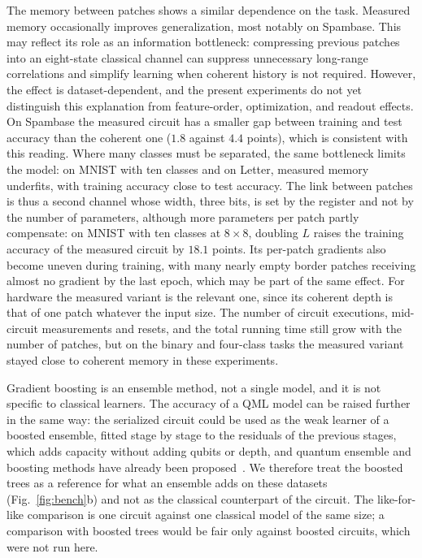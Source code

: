 \documentclass[11pt]{article}
\begin{document}
The memory between patches shows a similar dependence on the task. Measured memory occasionally improves generalization, most notably on Spambase. This may reflect its role as an information bottleneck: compressing previous patches into an eight-state classical channel can suppress unnecessary long-range correlations and simplify learning when coherent history is not required. However, the effect is dataset-dependent, and the present experiments do not yet distinguish this explanation from feature-order, optimization, and readout effects. On Spambase the measured circuit has a smaller gap between training and test accuracy than the coherent one ($1.8$ against $4.4$ points), which is consistent with this reading. Where many classes must be separated, the same bottleneck limits the model: on MNIST with ten classes and on Letter, measured memory underfits, with training accuracy close to test accuracy. The link between patches is thus a second channel whose width, three bits, is set by the register and not by the number of parameters, although more parameters per patch partly compensate: on MNIST with ten classes at $8\times8$, doubling $L$ raises the training accuracy of the measured circuit by $18.1$ points. Its per-patch gradients also become uneven during training, with many nearly empty border patches receiving almost no gradient by the last epoch, which may be part of the same effect. For hardware the measured variant is the relevant one, since its coherent depth is that of one patch whatever the input size. The number of circuit executions, mid-circuit measurements and resets, and the total running time still grow with the number of patches, but on the binary and four-class tasks the measured variant stayed close to coherent memory in these experiments.

Gradient boosting is an ensemble method, not a single model, and it is not specific to classical learners. The accuracy of a QML model can be raised further in the same way: the serialized circuit could be used as the weak learner of a boosted ensemble, fitted stage by stage to the residuals of the previous stages, which adds capacity without adding qubits or depth, and quantum ensemble and boosting methods have already been proposed~\cite{schuld2018ensembles,arunachalam2020boosting}. We therefore treat the boosted trees as a reference for what an ensemble adds on these datasets (Fig.~\ref{fig:bench}b) and not as the classical counterpart of the circuit. The like-for-like comparison is one circuit against one classical model of the same size; a comparison with boosted trees would be fair only against boosted circuits, which were not run here.
\end{document}
